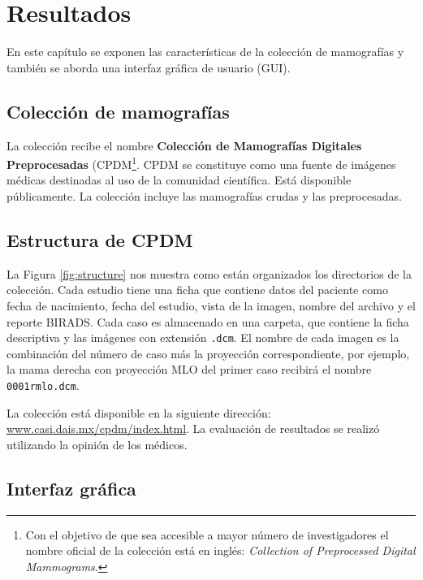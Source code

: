 \chapter{Resultados}
\label{resultados}

En este capítulo se exponen las características de la colección de mamografías y
también se aborda una interfaz gráfica de usuario (GUI).

\section{Colección de mamografías}

La colección recibe el nombre \textbf{Colección de Mamografías Digitales
Preprocesadas} (CPDM\footnote{Con el objetivo de que sea accesible a mayor
número de investigadores el nombre oficial de la colección está en inglés:
\textit{Collection of Preprocessed Digital Mammograms}.}. CPDM se constituye
como una fuente de imágenes médicas destinadas al uso de la comunidad
científica. Está disponible públicamente. La colección incluye las mamografías
crudas y las preprocesadas. 

\section{Estructura de CPDM}

La Figura \ref{fig:structure} nos muestra como están organizados los
directorios de la colección. Cada estudio tiene una ficha que contiene datos
del paciente como fecha de nacimiento, fecha del estudio, vista de la imagen,
nombre del archivo y el reporte BIRADS. Cada caso es almacenado en una carpeta,
que contiene la ficha descriptiva y las imágenes con extensión \texttt{.dcm}.
El nombre de cada imagen es la combinación del número de caso más la proyección
correspondiente, por ejemplo, la mama derecha con proyección MLO del primer
caso recibirá el nombre \texttt{0001rmlo.dcm}.

La colección está disponible en la siguiente dirección:
\url{www.casi.dais.mx/cpdm/index.html}. La evaluación de resultados se realizó
utilizando la opinión de los médicos.

\shorthandoff{>} %
    
\shorthandon{>} 

\section{Interfaz gráfica}

